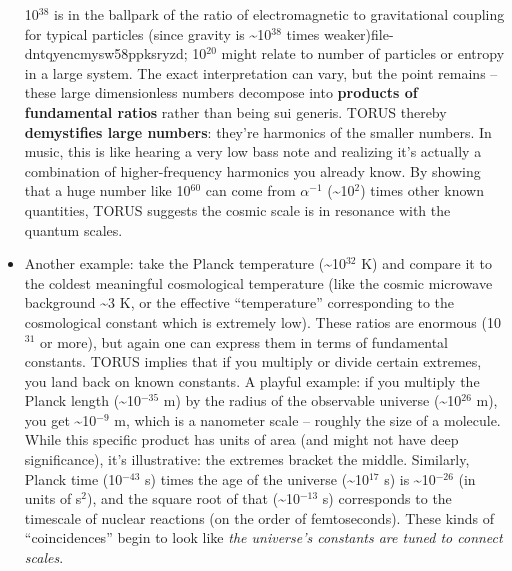 \documentclass[]{article}
\newcommand{\superscript}[1]{\ensuremath{^{\mathrm{#1}}}}
\begin{document}
\begin{itemize}
  10\superscript{38} is in the ballpark of the ratio of electromagnetic to
  gravitational coupling for typical particles (since gravity is
  \textasciitilde{}10\superscript{38} times weaker)​file-dntqyencmysw58ppksryzd;
  10\superscript{20} might relate to number of particles or entropy in a large
  system. The exact interpretation can vary, but the point remains --
  these large dimensionless numbers decompose into \textbf{products of
  fundamental ratios} rather than being sui generis. TORUS thereby
  \textbf{demystifies large numbers}: they're harmonics of the smaller
  numbers. In music, this is like hearing a very low bass note and
  realizing it's actually a combination of higher-frequency harmonics
  you already know. By showing that a huge number like 10\superscript{60} can come
  from $\alpha\superscript{−1}$ (\textasciitilde{}10\superscript{2}) times other known quantities,
  TORUS suggests the cosmic scale is in resonance with the quantum
  scales​.
\item
  Another example: take the Planck temperature
  (\textasciitilde{}10\superscript{32} K) and compare it to the coldest meaningful
  cosmological temperature (like the cosmic microwave background
  \textasciitilde{}3 K, or the effective ``temperature'' corresponding
  to the cosmological constant which is extremely low). These ratios are
  enormous (10\superscript{31} or more), but again one can express them in terms
  of fundamental constants. TORUS implies that if you multiply or divide
  certain extremes, you land back on known constants. A playful example:
  if you multiply the Planck length (\textasciitilde{}10\superscript{−35} m) by
  the radius of the observable universe (\textasciitilde{}10\superscript{26} m),
  you get \textasciitilde{}10\superscript{−9} m, which is a nanometer scale --
  roughly the size of a molecule. While this specific product has units
  of area (and might not have deep significance), it's illustrative: the
  extremes bracket the middle. Similarly, Planck time (10\superscript{−43} s)
  times the age of the universe (\textasciitilde{}10\superscript{17} s) is
  \textasciitilde{}10\superscript{−26} (in units of s\superscript{2}), and the square root
  of that (\textasciitilde{}10\superscript{−13} s) corresponds to the timescale of
  nuclear reactions (on the order of femtoseconds). These kinds of
  ``coincidences'' begin to look like \emph{the universe's constants are
  tuned to connect scales}.
\end{itemize}
\end{document}
